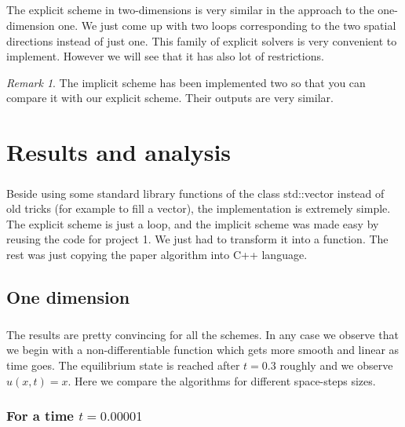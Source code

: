 \documentclass[a4paper, twoside, 11pt]{report}
\theoremstyle{theorem}
\theoremstyle{remark}
\newtheorem{remark}{Remark}[chapter]
\theoremstyle{exemple}
\begin{document}
                \paragraph{}The explicit scheme in two-dimensions is very similar in the approach to the one-dimension one. We just come up with two loops corresponding to the two spatial directions instead of just one. This family of explicit solvers is very convenient to implement. However we will see that it has also lot of restrictions.

                \begin{remark}
                    The implicit scheme has been implemented two so that you can compare it with our explicit scheme. Their outputs are very similar.
                \end{remark}


\chapter{Results and analysis}

    \paragraph{}Beside using some standard library functions of the class std::vector instead of old tricks (for example to fill a vector), the implementation is extremely simple. The explicit scheme is just a loop, and the implicit scheme was made easy by reusing the code for project 1. We just had to transform it into a function. The rest was just copying the paper algorithm into C++ language.

    \section{One dimension}

        \paragraph{}The results are pretty convincing for all the schemes. In any case we observe that we begin with a non-differentiable function which gets more smooth and linear as time goes. The equilibrium state is reached after $t=0.3$ roughly and we observe $u(x,t)=x$. Here we compare the algorithms for different space-steps sizes.

        \subsection{For a time $t=0.00001$}
\end{document}

